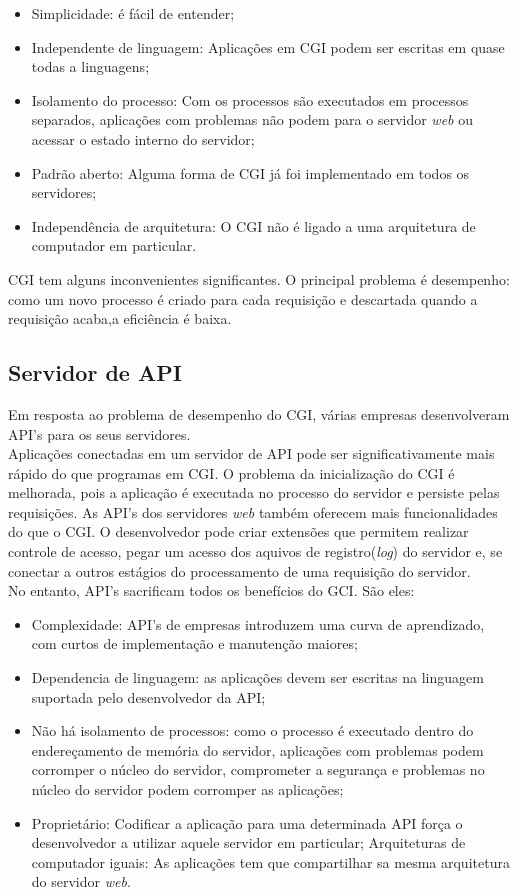 \begin{itemize}
	\item Simplicidade: é fácil de entender;
	\item Independente de linguagem: Aplicações em CGI podem ser escritas em quase todas a linguagens;
	\item Isolamento do processo: Com os processos são executados em processos separados, aplicações com problemas não podem para o servidor \textit{web} ou acessar o estado interno do servidor;
	\item Padrão aberto: Alguma forma de CGI já foi implementado em todos os servidores;
	\item Independência de arquitetura: O CGI não é ligado a uma arquitetura de computador em particular.
\end{itemize}

CGI tem alguns inconvenientes significantes. O principal problema é desempenho: como um novo processo é criado para cada requisição e descartada quando a requisição acaba,a eficiência é baixa.

\subsection{Servidor de API}
Em resposta ao problema de desempenho do CGI, várias empresas desenvolveram API's para os seus servidores.\\
Aplicações conectadas em um servidor de API pode ser significativamente mais rápido do que programas em CGI. O problema da inicialização do CGI é melhorada, pois a aplicação é executada no processo do servidor e persiste pelas requisições. As API's dos servidores \textit{web} também oferecem mais funcionalidades do que o CGI. O desenvolvedor pode criar extensões que permitem realizar controle de acesso, pegar um acesso dos aquivos de registro(\textit{log}) do servidor e, se conectar a outros estágios do processamento de uma requisição do servidor.\\
No entanto, API's sacrificam todos os benefícios do GCI. São eles:
\begin{itemize}
	\item Complexidade: API's de empresas introduzem uma curva de aprendizado, com curtos de implementação e manutenção maiores;
	\item Dependencia de linguagem: as aplicações devem ser escritas na linguagem suportada pelo desenvolvedor da API;
	\item Não há isolamento de processos: como o processo é executado dentro do endereçamento de memória do servidor, aplicações com problemas podem corromper o núcleo do servidor, comprometer a segurança e problemas no núcleo do servidor podem corromper as aplicações;
	\item Proprietário: Codificar a aplicação para uma determinada API força o desenvolvedor a utilizar aquele servidor em particular;
	Arquiteturas de computador iguais: As aplicações tem que compartilhar sa mesma arquitetura do servidor \textit{web}.

\end{itemize}

